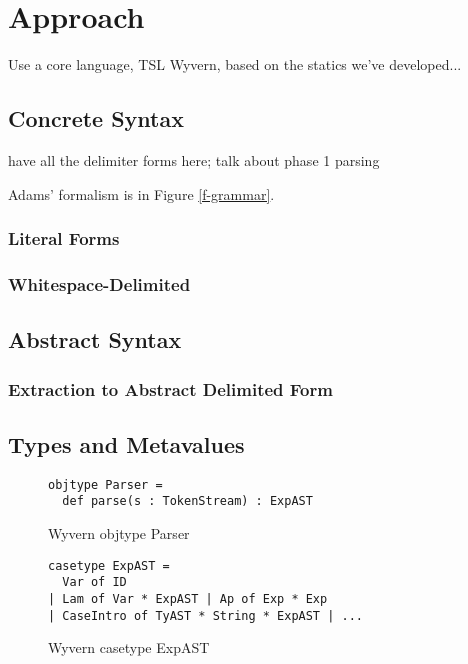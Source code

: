 \section{Approach}
\label{s:approach}
Use a core language, TSL Wyvern, based on the statics we've developed...


\subsection{Concrete Syntax}
have all the delimiter forms here; talk about phase 1 parsing

Adams' formalism is in Figure \ref{f-grammar}.


\subsubsection{Literal Forms}
\subsubsection{Whitespace-Delimited}

\subsection{Abstract Syntax}
\subsubsection{Extraction to Abstract Delimited Form}

\subsection{Types and Metavalues}



\begin{figure}
\begin{lstlisting}
objtype Parser = 
  def parse(s : TokenStream) : ExpAST
\end{lstlisting}
\caption{Wyvern objtype Parser}
\label{}
\end{figure}

\begin{figure}
\begin{lstlisting}
casetype ExpAST = 
  Var of ID 
| Lam of Var * ExpAST | Ap of Exp * Exp 
| CaseIntro of TyAST * String * ExpAST | ...
\end{lstlisting}
\caption{Wyvern casetype ExpAST}
\label{}
\end{figure}

